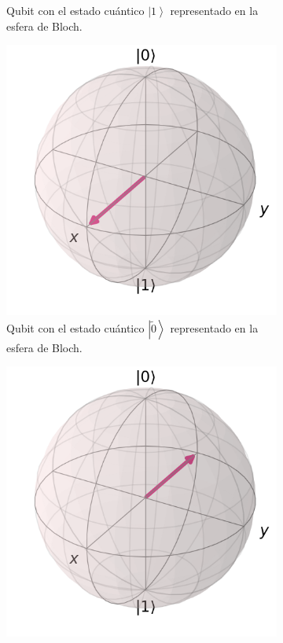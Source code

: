 \begin{figure}[H]
\begin{subfigure}{0.5\linewidth}
        \caption{Qubit con el estado cuántico $\left|1 \right\rangle$ representado en la esfera de Bloch.}
    \end{subfigure}
    \begin{subfigure}{0.5\linewidth}
        \centering
        \includegraphics[scale=0.3]{images/2.png}
        \caption{Qubit con el estado cuántico $\left|\tilde{0} \right\rangle$ representado en la esfera de Bloch.}
    \end{subfigure}
    \begin{subfigure}{0.5\linewidth}
        \centering
        \includegraphics[scale=0.3]{images/3.png}

\end{subfigure}
\end{figure}

